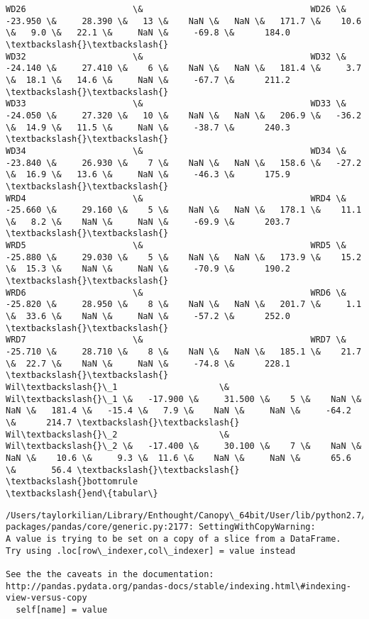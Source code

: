 \documentclass{article}
\begin{document}
\begin{Verbatim}[commandchars=\\\{\}]
WD26                     \&                                 WD26 \&   -23.950 \&     28.390 \&   13 \&    NaN \&   NaN \&   171.7 \&    10.6 \&   9.0 \&   22.1 \&     NaN \&     -69.8 \&      184.0 \textbackslash{}\textbackslash{}
WD32                     \&                                 WD32 \&   -24.140 \&     27.410 \&    6 \&    NaN \&   NaN \&   181.4 \&     3.7 \&  18.1 \&   14.6 \&     NaN \&     -67.7 \&      211.2 \textbackslash{}\textbackslash{}
WD33                     \&                                 WD33 \&   -24.050 \&     27.320 \&   10 \&    NaN \&   NaN \&   206.9 \&   -36.2 \&  14.9 \&   11.5 \&     NaN \&     -38.7 \&      240.3 \textbackslash{}\textbackslash{}
WD34                     \&                                 WD34 \&   -23.840 \&     26.930 \&    7 \&    NaN \&   NaN \&   158.6 \&   -27.2 \&  16.9 \&   13.6 \&     NaN \&     -46.3 \&      175.9 \textbackslash{}\textbackslash{}
WRD4                     \&                                 WRD4 \&   -25.660 \&     29.160 \&    5 \&    NaN \&   NaN \&   178.1 \&    11.1 \&   8.2 \&    NaN \&     NaN \&     -69.9 \&      203.7 \textbackslash{}\textbackslash{}
WRD5                     \&                                 WRD5 \&   -25.880 \&     29.030 \&    5 \&    NaN \&   NaN \&   173.9 \&    15.2 \&  15.3 \&    NaN \&     NaN \&     -70.9 \&      190.2 \textbackslash{}\textbackslash{}
WRD6                     \&                                 WRD6 \&   -25.820 \&     28.950 \&    8 \&    NaN \&   NaN \&   201.7 \&     1.1 \&  33.6 \&    NaN \&     NaN \&     -57.2 \&      252.0 \textbackslash{}\textbackslash{}
WRD7                     \&                                 WRD7 \&   -25.710 \&     28.710 \&    8 \&    NaN \&   NaN \&   185.1 \&    21.7 \&  22.7 \&    NaN \&     NaN \&     -74.8 \&      228.1 \textbackslash{}\textbackslash{}
Wil\textbackslash{}\_1                    \&                                Wil\textbackslash{}\_1 \&   -17.900 \&     31.500 \&    5 \&    NaN \&   NaN \&   181.4 \&   -15.4 \&   7.9 \&    NaN \&     NaN \&     -64.2 \&      214.7 \textbackslash{}\textbackslash{}
Wil\textbackslash{}\_2                    \&                                Wil\textbackslash{}\_2 \&   -17.400 \&     30.100 \&    7 \&    NaN \&   NaN \&    10.6 \&     9.3 \&  11.6 \&    NaN \&     NaN \&      65.6 \&       56.4 \textbackslash{}\textbackslash{}
\textbackslash{}bottomrule
\textbackslash{}end\{tabular\}
    \end{Verbatim}

    \begin{Verbatim}[commandchars=\\\{\}]
/Users/taylorkilian/Library/Enthought/Canopy\_64bit/User/lib/python2.7/site-packages/pandas/core/generic.py:2177: SettingWithCopyWarning: 
A value is trying to be set on a copy of a slice from a DataFrame.
Try using .loc[row\_indexer,col\_indexer] = value instead

See the the caveats in the documentation: http://pandas.pydata.org/pandas-docs/stable/indexing.html\#indexing-view-versus-copy
  self[name] = value
    \end{Verbatim}
\end{document}
